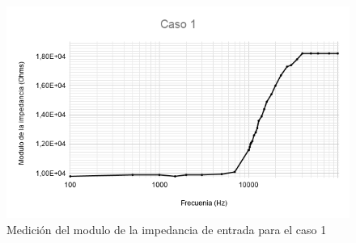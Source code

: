 \begin{figure}[H]
\begin{centering}
\includegraphics[scale=0.5]{../Ex1/iA/Resources1a/zinpm1_med}
\par\end{centering}
\caption{Medición del modulo de la impedancia de entrada para el caso 1}

\end{figure}

